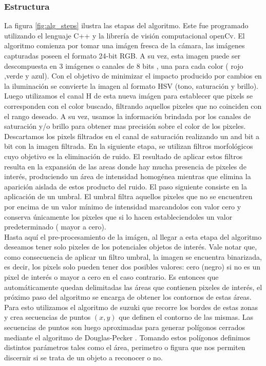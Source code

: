 \subsubsection{Estructura}
La figura \ref{fig:alg_steps} ilustra las etapas del algoritmo. Este fue programado utilizando el lenguaje C++ y la librería de visión computacional openCv.
El algoritmo comienza por tomar una imágen fresca de la cámara, las imágenes capturadas poseen el formato 24-bit RGB. A su vez, esta imagen puede ser descompuesta en 3 imágenes o canales de 8 bits , una para cada color ( rojo ,verde y azul). Con el objetivo de minimizar el impacto producido por cambios en la iluminación se convierte la imagen al formato HSV (tono, saturación y brillo). Luego utilizamos el canal H de esta nueva imágen para establecer que pixels se corresponden con el color buscado, filtrando aquellos pixeles que no coinciden con el rango deseado. A su vez, usamos la información brindada por los  canales de saturación y/o brillo para obtener mas precisión sobre el color de los pixeles.\\
	\indent Descartamos los pixels filtrados en el canal de saturación realizando un and bit a bit con la imagen filtrada.  En la siguiente etapa, se utilizan filtros morfológicos cuyo objetivo es la eliminación de ruido. El resultado de aplicar estos filtros resulta en la expansión de las areas donde hay mucha presencia de pixeles de interés, produciendo un área de intensidad homogénea mientras que elimina la aparición aislada de estos producto del ruido. El paso siguiente consiste en la aplicación de un umbral. El umbral filtra aquellos pixeles que no se encuentren por encima de un valor mínimo de intensidad marcandolos con valor cero y conserva únicamente los pixeles que si lo hacen estableciendoles un valor predeterminado ( mayor a cero). \\
	\indent Hasta aquí el pre-procesamiento de la imágen, al llegar a esta etapa del algoritmo deseamos tener solo pixeles de los potenciales objetos de interés. Vale notar que, como consecuencia de aplicar un filtro umbral, la imagen se encuentra binarizada, es decir, los pixels solo pueden tener dos posibles valores: cero (negro) si no es un pixel de interés o mayor a cero en el caso contrario. Es entonces que automáticamente quedan delimitadas las áreas que contienen pixeles de interés, el próximo paso del algoritmo se encarga de obtener los contornos de estas áreas. Para esto utilizamos el algoritmo de suzuki \cite{suzuki85} que recorre los bordes de estas zonas y crea secuencias de puntos $(x,y)$ que definen el contorno de las mismas. Las secuencias de puntos son luego aproximadas para generar polígonos cerrados mediante el algoritmo de Douglas-Pecker \cite{dp74}. Tomando estos polígonos definimos distintos parámetros tales como el área, perimetro o figura que nos permiten discernir si se trata de un objeto a reconocer o no.


